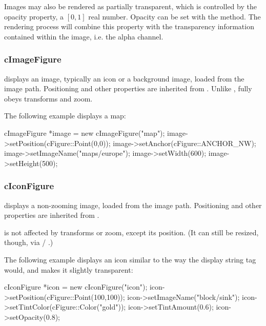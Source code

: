 Images may also be rendered as partially transparent, which is controlled by
the opacity property, a $[0,1]$ real number. Opacity can be set with the
 method. The rendering process will combine this
property with the transparency information contained within the image, i.e.
the alpha channel.


\subsubsection{cImageFigure}
\label{sec:graphics:imagefigure}

 displays an image, typically an icon or a background
image, loaded from the {\opp} image path. Positioning and other properties
are inherited from . Unlike ,
 fully obeys transforms and zoom.

The following example displays a map:

\begin{cpp}
cImageFigure *image = new cImageFigure("map");
image->setPosition(cFigure::Point(0,0));
image->setAnchor(cFigure::ANCHOR_NW);
image->setImageName("maps/europe");
image->setWidth(600);
image->setHeight(500);
\end{cpp}



\subsubsection{cIconFigure}
\label{sec:graphics:iconfigure}

 displays a non-zooming image, loaded from the {\opp}
image path. Positioning and other properties are inherited from
.

 is not affected by transforms or zoom, except its position.
(It can still be resized, though, via  / .)

The following example displays an icon similar to the way the
 display string tag would, and makes
it slightly transparent:

\begin{cpp}
cIconFigure *icon = new cIconFigure("icon");
icon->setPosition(cFigure::Point(100,100));
icon->setImageName("block/sink");
icon->setTintColor(cFigure::Color("gold"));
icon->setTintAmount(0.6);
icon->setOpacity(0.8);
\end{cpp}

